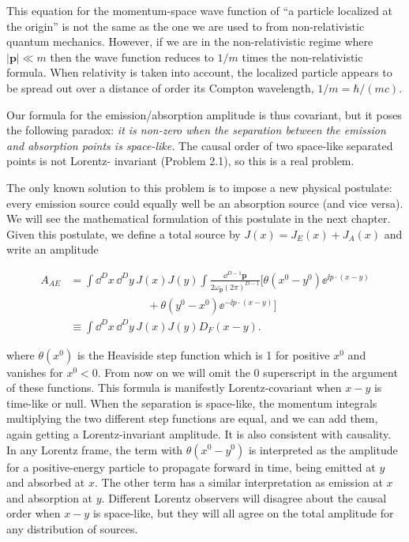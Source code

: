 This equation for the momentum-space wave function of ``a particle localized at
the origin'' is not the same as the one we are used to from non-relativistic quantum
mechanics. However, if we are in the non-relativistic regime where $|\mathbf p|\ll m$ then the
wave function reduces to $1/m$ times the non-relativistic formula. When relativity is
taken into account, the localized particle appears to be spread out over a distance of
order its Compton wavelength, $1/m=\hbar/(mc)$.

Our formula for the emission/absorption amplitude is thus covariant, but it poses the
following paradox: \emph{it is non-zero when the separation between the emission and absorption
points is space-like.} The causal order of two space-like separated points is not Lorentz-
invariant (Problem 2.1), so this is a real problem.

The only known solution to this problem is to impose a new physical postulate:
every emission source could equally well be an absorption source (and vice versa). We
will see the mathematical formulation of this postulate in the next chapter. Given this
postulate, we define a total source by $J(x)=J_E(x)+J_A(x)$ and write an amplitude

\begin{equation}
\begin{aligned}
  A_{AE}&=\int\dd^D x\,\dd^D y\,J(x)J(y)\int\frac{\dd^{D-1}\mathbf p}{2\omega_{\mathbf p}(2\pi)^{D-1}}
  \bigl[\theta(x^0-y^0)\ee^{\ii p\mathbin{\cdot}(x-y)}\\
  &\hspace{7em}+\theta(y^0-x^0)\ee^{-\ii p\mathbin{\cdot}(x-y)}\bigr]\\
  &\equiv\int\dd^D x\,\dd^D y\,J(x)J(y)D_F(x-y).
\end{aligned}
\label{eq:1.4}
\end{equation}

where $\theta(x^0)$ is the Heaviside step function which is 1 for positive $x^0$ and vanishes for
$x^0<0$. From now on we will omit the $0$ superscript in the argument of these functions.
This formula is manifestly Lorentz-covariant when $x-y$ is time-like or null. When
the separation is space-like, the momentum integrals multiplying the two different step
functions are equal, and we can add them, again getting a Lorentz-invariant amplitude.
It is also consistent with causality. In any Lorentz frame, the term with $\theta(x^0-y^0)$ is
interpreted as the amplitude for a positive-energy particle to propagate forward in time,
being emitted at $y$ and absorbed at $x$. The other term has a similar interpretation as
emission at $x$ and absorption at $y$. Different Lorentz observers will disagree about the
causal order when $x-y$ is space-like, but they will all agree on the total amplitude for
any distribution of sources.

